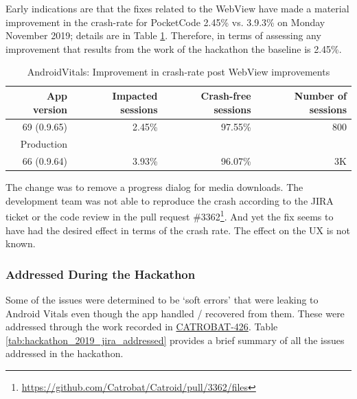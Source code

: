 Early indications are that the fixes related to the WebView have made a material improvement in the crash-rate for PocketCode 2.45\% vs. 3.9.3\% on Monday  November 2019; details are in Table \ref{tab:androidvitals_rollout_of_0_9_65}. Therefore, in terms of assessing any improvement that results from the work of the hackathon the baseline is 2.45\%.

\begin{table}[htbp!]
    \centering
    \footnotesize
    \begin{tabular}{r|r|r|r}
        App version &Impacted sessions &Crash-free sessions &Number of sessions  \\
        \hline
        69 (0.9.65) &2.45\% &	97.55\% 	&~800 \\
        Production &&& \\
        \hline
        66 (0.9.64) &3.93\% &96.07\% 	&~3K
    \end{tabular}
    \caption{AndroidVitals: Improvement in crash-rate post WebView improvements}
    \label{tab:androidvitals_rollout_of_0_9_65}
\end{table}

The change was to remove a progress dialog for media downloads. The development team was not able to reproduce the crash according to the JIRA ticket or the code review in the pull request \#3362\footnote{\url{https://github.com/Catrobat/Catroid/pull/3362/files}}. And yet the fix seems to have had the desired effect in terms of the crash rate. The effect on the UX is not known.

\subsubsection{Addressed During the Hackathon}
Some of the issues were determined to be `soft errors' that were leaking to Android Vitals even though the app handled / recovered from them. These were addressed through the work recorded in  \href{https://jira.catrob.at/browse/CATROID-426}{CATROBAT-426}. Table \ref{tab:hackathon_2019_jira_addressed} provides a brief summary of all the issues addressed in the hackathon.


